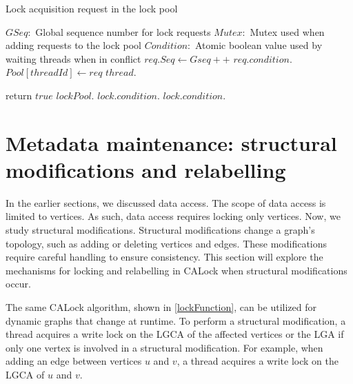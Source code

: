 		

\begin{algorithm}
	\caption{Lock acquisition request in the lock pool}\label{lockFunction}
	\begin{algorithmic}[1]
		\State $GSeq: $ Global sequence number for lock requests
		\State $Mutex: $ Mutex used when adding requests to the lock pool
		\State $Condition:$ Atomic boolean value used by waiting threads when in conflict
		\Statex
		\State {}
		\State $req.Seq \gets Gseq++$ \label{seqNoAllocation}
		\State $req.condition.$ \label{waitTrue}
		\State $Pool[threadId] \gets req$ \label{addToPool}
		\State {}
		 \label{conflictCheck}
		\State $thread.$
		\EndIf
		
		\EndFor
		\State return $true$
		\EndProcedure
		\Statex
		\State $lockPool.$
		\State $lock.condition.$
		\State $lock.condition.$
		\EndProcedure
	\end{algorithmic}
\end{algorithm}





\newpage
\section{Metadata maintenance: structural modifications and relabelling}

In the earlier sections, we discussed data access. The scope of data access is limited to vertices. As such, data access requires locking only vertices. Now, we study structural modifications. Structural modifications change a graph's topology, such as adding or deleting vertices and edges. These modifications require careful handling to ensure consistency. This section will explore the mechanisms for locking and relabelling in CALock when structural modifications occur.

The same CALock algorithm, shown in \cref{lockFunction}, can be utilized for dynamic graphs that change at runtime. 
To perform a structural modification, a thread acquires a write lock on the LGCA of the affected vertices or the LGA if only one vertex is involved in a structural modification. For example, when adding an edge between vertices $u$ and $v$, a thread acquires a write lock on the LGCA of $u$ and $v$. 


